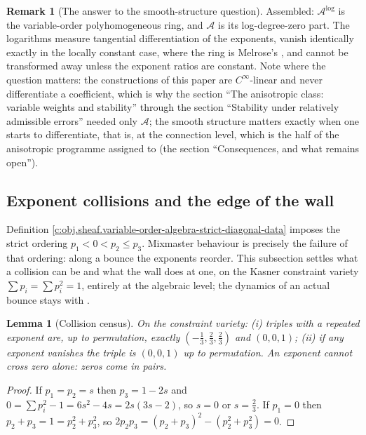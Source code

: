 \documentclass[11pt]{article}
\newtheorem{lemma}[theorem]{Lemma}
\theoremstyle{definition}
\newtheorem{remark}[theorem]{Remark}
\theoremstyle{plain}
\begin{document}
\begin{remark}[The answer to the smooth-structure question]\label{c:note.sheaf.answer-smooth-structure-question}
Assembled: $\mathcal{A}^{\log}$ is the variable-order polyhomogeneous ring, and $\mathcal{A}$ is its log-degree-zero part. The logarithms measure tangential differentiation of the exponents, vanish identically exactly in the locally constant case, where the ring is Melrose's \cite{Melrose1993}, and cannot be transformed away unless the exponent ratios are constant. Note where the question matters: the constructions of this paper are $C^\infty$-linear and never differentiate a coefficient, which is why the section ``The anisotropic class: variable weights and stability'' through the section ``Stability under relatively admissible errors'' needed only $\mathcal{A}$; the smooth structure matters exactly when one starts to differentiate, that is, at the connection level, which is the half of the anisotropic programme assigned to \cite{ButlerT6} (the section ``Consequences, and what remains open'').
\end{remark}

\subsection*{Exponent collisions and the edge of the wall}
\label{c:note.sheaf.setting-exponent-collisions-edge-wall}
Definition \ref{c:obj.sheaf.variable-order-algebra-strict-diagonal-data} imposes the strict ordering $p_1 < 0 < p_2 \leq p_3$. Mixmaster behaviour is precisely the failure of that ordering: along a bounce the exponents reorder. This subsection settles what a collision can be and what the wall does at one, on the Kasner constraint variety $\sum p_i = \sum p_i^2 = 1$, entirely at the algebraic level; the dynamics of an actual bounce stays with \cite{ButlerT6}.

\begin{lemma}[Collision census]\label{c:sheaf.collision-census}
On the constraint variety: (i) triples with a repeated exponent are, up to permutation, exactly $(-\tfrac13, \tfrac23, \tfrac23)$ and $(0,0,1)$; (ii) if any exponent vanishes the triple is $(0,0,1)$ up to permutation. An exponent cannot cross zero alone: zeros come in pairs.
\end{lemma}
\begin{proof}
If $p_1 = p_2 = s$ then $p_3 = 1-2s$ and $0 = \sum p_i^2 - 1 = 6s^2 - 4s = 2s(3s-2)$, so $s = 0$ or $s = \tfrac23$. If $p_1 = 0$ then $p_2 + p_3 = 1 = p_2^2 + p_3^2$, so $2p_2p_3 = (p_2+p_3)^2 - (p_2^2+p_3^2) = 0$.

\end{proof}
\end{document}

